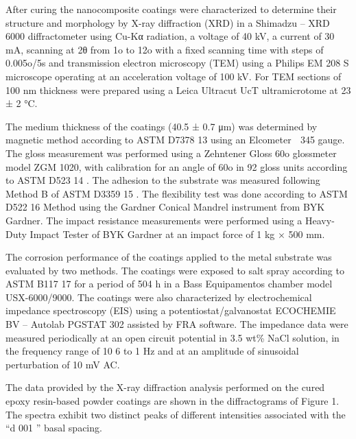 \begin{multicols}{2}
\par{}After curing the nanocomposite coatings were characterized
to determine their structure and morphology by X-ray
diffraction (XRD) in a Shimadzu – XRD 6000 diffractometer
using Cu-Kα radiation, a voltage of 40 kV, a current of
30 mA, scanning at 2θ from 1o to 12o with a fixed scanning
time with steps of 0.005o/5s and transmission electron
microscopy (TEM) using a Philips EM 208 S microscope
operating at an acceleration voltage of 100 kV. For TEM sections of 100 nm thickness were prepared using a Leica
Ultracut UcT ultramicrotome at 23 ± 2 °C.
\par{}The medium thickness of the coatings (40.5 ± 0.7 μm) was
determined by magnetic method according to ASTM D7378 13
using an Elcometer  345 gauge. The gloss measurement
was performed using a Zehntener Gloss 60o glossmeter
model ZGM 1020, with calibration for an angle of 60o in
92 gloss units according to ASTM D523 14 . The adhesion to
the substrate was measured following Method B of ASTM
D3359 15 . The flexibility test was done according to ASTM
D522 16 Method using the Gardner Conical Mandrel instrument
from BYK Gardner. The impact resistance measurements
were performed using a Heavy-Duty Impact Tester of BYK
Gardner at an impact force of 1 kg × 500 mm.
\par{}The corrosion performance of the coatings applied to the
metal substrate was evaluated by two methods. The coatings
were exposed to salt spray according to ASTM B117 17 for
a period of 504 h in a Bass Equipamentos chamber model
USX-6000/9000. The coatings were also characterized
by electrochemical impedance spectroscopy (EIS) using
a potentiostat/galvanostat ECOCHEMIE BV – Autolab
PGSTAT 302 assisted by FRA software. The impedance data
were measured periodically at an open circuit potential in
3.5 wt\% NaCl solution, in the frequency range of 10 6 to 1 Hz
and at an amplitude of sinusoidal perturbation of 10 mV AC.


The data provided by the X-ray diffraction analysis
performed on the cured epoxy resin-based powder coatings
are shown in the diffractograms of Figure 1. The spectra
exhibit two distinct peaks of different intensities associated
with the “d 001 ” basal spacing.


\lipsum




\end{multicols}
